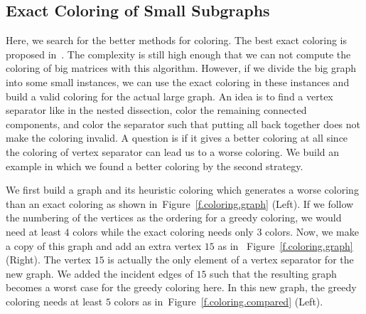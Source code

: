 \documentclass[11pt, twoside,a4paper]{book}
\newcommand{\figref}[1]{Figure~\protect\ref{#1}}
\begin{document}
\subsection{Exact Coloring of Small Subgraphs}
\label{s.exact}
Here, we search for the better methods for coloring. 
The best exact coloring is proposed in~\cite{bjorklund2009}.
The complexity is still high enough that we can not compute the coloring
of big matrices with this algorithm.
However, if we divide the big graph into some small instances,
we can use the exact coloring in these instances and build a valid coloring
for the actual large graph.
An idea is to find a vertex separator like in the nested dissection, color
the remaining connected components, and color the separator such that putting
all back together does not make the coloring invalid.
A question is if it gives a better coloring at all since the coloring of vertex separator
can lead us to a worse coloring.
We build an example in which we found a better coloring by the second strategy.

We first build a graph and its heuristic coloring which generates a worse coloring 
than an exact coloring as shown in~\figref{f.coloring.graph} (Left). If we follow 
the numbering of the vertices as the ordering for a greedy coloring, we would need 
at least $4$ colors while the exact coloring needs only $3$ colors.
Now, we make a copy of this graph and add an extra vertex $15$ as in
~\figref{f.coloring.graph} (Right). The vertex $15$ is actually the only element of
a vertex separator for the new graph. We added the incident edges of $15$ such that
the resulting graph becomes a worst case for the greedy coloring here.
In this new graph, the greedy coloring needs at least $5$ colors 
as in~\figref{f.coloring.compared} (Left). 
\end{document}
